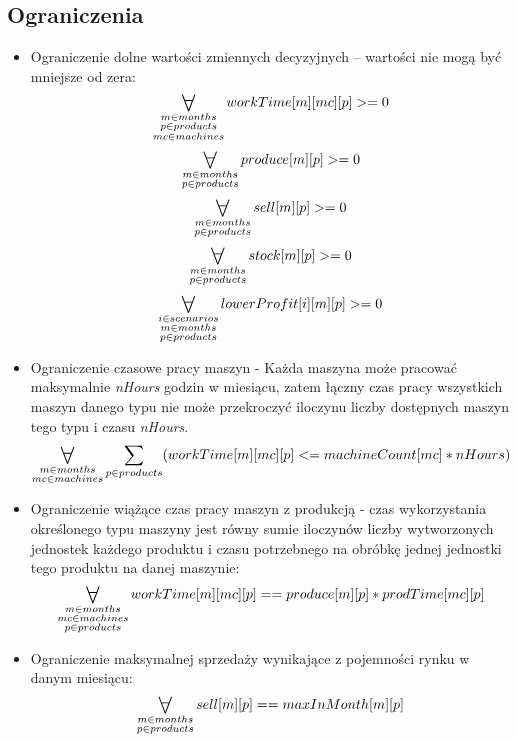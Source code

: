 \documentclass[11pt,a4paper]{article}
\newcommand\bigforall{%
  \mathop{\lower0.75ex\hbox{\ensuremath{%
    \mathlarger{\mathlarger{\mathlarger{\mathlarger{\forall}}}}}}}%
  \limits}
\begin{document}
\subsection{Ograniczenia}
\begin{itemize}
\item Ograniczenie dolne wartości zmiennych decyzyjnych – wartości nie mogą być mniejsze od zera:
	\begin{equation}
	\bigforall_{\substack{
			m \in months \\ 
			p \in products \\
			mc \in machines}} workTime[m][mc][p] >=0
	\end{equation}
	\begin{equation}
	\bigforall_{\substack{
			m \in months \\ 
			p \in products}} produce[m][p] >=0
	\end{equation}
	\begin{equation}
	\bigforall_{\substack{
			m \in months \\ 
			p \in products}} sell[m][p] >=0
	\end{equation}
	\begin{equation}
	\bigforall_{\substack{
			m \in months \\ 
			p \in products}} stock[m][p] >=0
	\end{equation}
	\begin{equation}
	\bigforall_{\substack{
			i \in scenarios \\
			m \in months \\ 
			p \in products}} lowerProfit[i][m][p] >=0
	\end{equation}

\item Ograniczenie czasowe pracy maszyn - Każda maszyna może pracować maksymalnie \textit{nHours} godzin w miesiącu, zatem łączny czas pracy wszystkich maszyn danego typu nie może przekroczyć iloczynu liczby dostępnych maszyn tego typu i czasu \textit{nHours}.
	\begin{equation}
		\bigforall_{\substack{
			m \in months\\ 
			mc \in machines}}  \sum_{p \in products}
		(workTime[m][mc][p] <= machineCount[mc]*nHours)
	\end{equation}
    \item Ograniczenie wiążące czas pracy maszyn z produkcją - czas wykorzystania określonego typu maszyny jest równy sumie iloczynów liczby wytworzonych jednostek każdego produktu i czasu potrzebnego na obróbkę jednej jednostki tego produktu na danej maszynie:
	\begin{equation}
		\bigforall_{\substack{
			m \in months\\ 
			mc \in machines\\
			p \in products}} workTime[m][mc][p] == produce[m][p]*prodTime[mc][p]
	\end{equation}
    \item Ograniczenie maksymalnej sprzedaży wynikające z pojemności rynku w danym miesiącu:
	\begin{equation}
		\bigforall_{\substack{
			m \in months\\ 
			p \in products}} sell[m][p] == maxInMonth[m][p]
	\end{equation}
	

\end{itemize}
\end{document}
